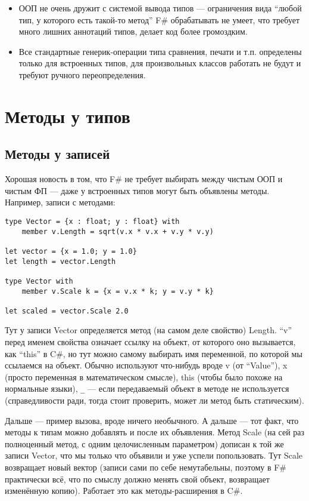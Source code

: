 \documentclass{../../text-style}
\begin{document}
\begin{itemize}
    \item ООП не очень дружит с системой вывода типов --- ограничения вида \enquote{любой тип, у которого есть такой-то метод} F\# обрабатывать не умеет, что требует много лишних аннотаций типов, делает код более громоздким.
    \item Все стандартные генерик-операции типа сравнения, печати и т.п. определены только для встроенных типов, для произвольных классов работать не будут и требуют ручного переопределения.
\end{itemize}

\section{Методы у типов}

\subsection{Методы у записей}

Хорошая новость в том, что F\# не требует выбирать между чистым ООП и чистым ФП --- даже у встроенных типов могут быть объявлены методы.
Например, записи с методами:

\begin{verbatim}
type Vector = {x : float; y : float} with
    member v.Length = sqrt(v.x * v.x + v.y * v.y)

let vector = {x = 1.0; y = 1.0}
let length = vector.Length

type Vector with
    member v.Scale k = {x = v.x * k; y = v.y * k}

let scaled = vector.Scale 2.0
\end{verbatim}

Тут у записи Vector определяется метод (на самом деле свойство) Length. \enquote{v} перед именем свойства означает ссылку на объект, от которого оно вызывается, как \enquote{this} в C\#, но тут можно самому выбирать имя переменной, по которой мы ссылаемся на объект.
Обычно используют что-нибудь вроде v (от \enquote{Value}), x (просто переменная в математическом смысле), this (чтобы было похоже на нормальные языки), \texttt{_} --- если передаваемый объект в методе не используется (справедливости ради, тогда стоит проверить, может ли метод быть статическим).

Дальше --- пример вызова, вроде ничего необычного.
А дальше --- тот факт, что методы к типам можно добавлять и после их объявления.
Метод Scale (на сей раз полноценный метод, с одним целочисленным параметром) дописан к той же записи Vector, что мы только что объявили и уже успели попользовать.
Тут Scale возвращает новый вектор (записи сами по себе немутабельны, поэтому в F\# практически всё, что по смыслу должно менять свой объект, возвращает изменённую копию).
Работает это как методы-расширения в C\#.
\end{document}
